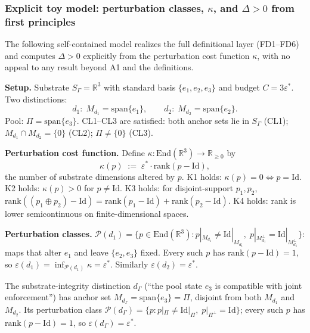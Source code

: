 \documentclass[11pt]{article}
\theoremstyle{remark}
\begin{document}
\subsubsection*{Explicit toy model: perturbation classes, $\kappa$, and $\Delta > 0$ from first principles}
\label{sec:toy_kappa}

The following self-contained model realizes the full definitional layer (FD1--FD6) and computes $\Delta > 0$ explicitly from the perturbation cost function $\kappa$, with no appeal to any result beyond A1 and the definitions.

\smallskip\noindent\textbf{Setup.}  Substrate $S_\Gamma = \mathbb{R}^3$ with standard basis $\{e_1, e_2, e_3\}$ and budget $C = 3\varepsilon^*$.  Two distinctions:
\[
d_1:\; M_{d_1} = \mathrm{span}\{e_1\}, \qquad d_2:\; M_{d_2} = \mathrm{span}\{e_2\}.
\]
Pool: $\Pi = \mathrm{span}\{e_3\}$.  CL1--CL3 are satisfied: both anchor sets lie in $S_\Gamma$ (CL1); $M_{d_1} \cap M_{d_2} = \{0\}$ (CL2); $\Pi \ne \{0\}$ (CL3).

\smallskip\noindent\textbf{Perturbation cost function.}  Define $\kappa: \mathrm{End}(\mathbb{R}^3) \to \mathbb{R}_{\ge 0}$ by
\[
\kappa(p) \;:=\; \varepsilon^* \cdot \mathrm{rank}(p - \mathrm{Id}),
\]
the number of substrate dimensions altered by $p$.  K1 holds: $\kappa(p) = 0 \Leftrightarrow p = \mathrm{Id}$.  K2 holds: $\kappa(p) > 0$ for $p \ne \mathrm{Id}$.  K3 holds: for disjoint-support $p_1, p_2$, $\mathrm{rank}((p_1 \oplus p_2) - \mathrm{Id}) = \mathrm{rank}(p_1 - \mathrm{Id}) + \mathrm{rank}(p_2 - \mathrm{Id})$.  K4 holds: rank is lower semicontinuous on finite-dimensional spaces.

\smallskip\noindent\textbf{Perturbation classes.}
$\mathcal{P}(d_1) = \{p \in \mathrm{End}(\mathbb{R}^3) : p|_{M_{d_1}} \ne \mathrm{Id}|_{M_{d_1}},\; p|_{M_{d_1}^\perp} = \mathrm{Id}|_{M_{d_1}^\perp}\}$: maps that alter $e_1$ and leave $\{e_2, e_3\}$ fixed.  Every such $p$ has $\mathrm{rank}(p - \mathrm{Id}) = 1$, so $\varepsilon(d_1) = \inf_{\mathcal{P}(d_1)} \kappa = \varepsilon^*$.  Similarly $\varepsilon(d_2) = \varepsilon^*$.

The substrate-integrity distinction $d_\Gamma$ (``the pool state $e_3$ is compatible with joint enforcement'') has anchor set $M_{d_\Gamma} = \mathrm{span}\{e_3\} = \Pi$, disjoint from both $M_{d_1}$ and $M_{d_2}$.  Its perturbation class $\mathcal{P}(d_\Gamma) = \{p : p|_\Pi \ne \mathrm{Id}|_\Pi,\; p|_{\Pi^\perp} = \mathrm{Id}\}$; every such $p$ has $\mathrm{rank}(p - \mathrm{Id}) = 1$, so $\varepsilon(d_\Gamma) = \varepsilon^*$.
\end{document}
